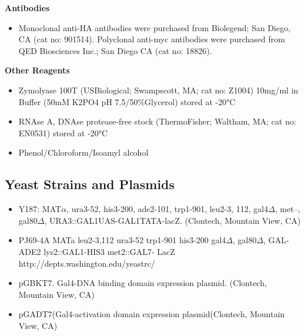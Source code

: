 \documentclass[11pt,fleqn]{book} %
\begin{document}
\textbf{Antibodies}

\begin{itemize}
    \item Monoclonal anti-HA antibodies were purchased from Biolegend; San Diego, CA (cat no: 901514).  Polyclonal anti-myc antibodies were purchased from QED Biosciences Inc.; San Diego CA (cat no: 18826).
\end{itemize}

\textbf{Other Reagents}

\begin{itemize}
    \item Zymolyase 100T (USBiological; Swampscott, MA; cat no: Z1004) 10mg/ml in Buffer (50mM K2PO4 pH 7.5/50\%Glycerol) stored at -20°C
    \item RNAse A, DNAse protease-free stock (ThermoFisher; Waltham, MA; cat no: EN0531) stored at -20°C
    \item Phenol/Chloroform/Isoamyl alcohol
\end{itemize}

\subsection{Yeast Strains and Plasmids}

\begin{itemize}
    \item Y187:  MAT$\alpha$, ura3-52, his3-200, ade2-101, trp1-901, leu2-3, 112, gal4$\Delta$, met–, gal80$\Delta$, URA3::GAL1UAS-GAL1TATA-lacZ.  (Clontech, Mountain View, CA)
    \item PJ69-4A MATa leu2-3,112 ura3-52 trp1-901 his3-200 gal4$\Delta$, gal80$\Delta$, GAL-ADE2 lys2::GAL1-HIS3 met2::GAL7- LacZ   http://depts.washington.edu/yeastrc/
    \item pGBKT7.  Gal4-DNA binding domain expression plasmid. (Clontech, Mountain View, CA)
    \item pGADT7(Gal4-activation domain expression plasmid(Clontech, Mountain View, CA)
\end{itemize}


\end{document}
